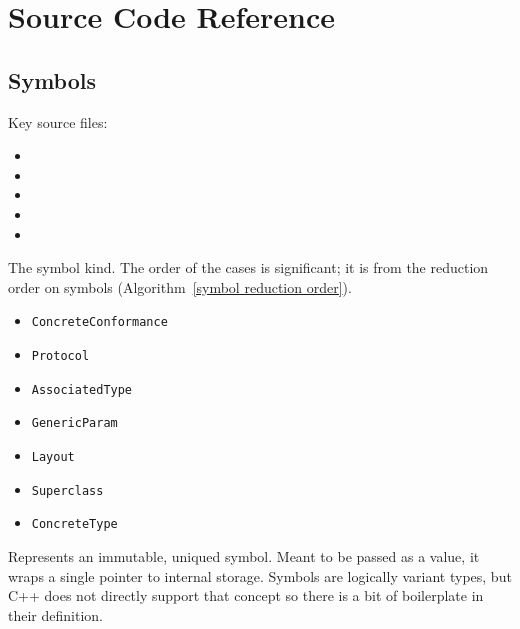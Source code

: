 \documentclass[../generics]{subfiles}
\begin{document}
\section{Source Code Reference}\label{symbols terms rules sourceref}

\subsection*{Symbols}

Key source files:
\begin{itemize}
\item {}
\item {}
\item {}
\item {}
\item {}
\end{itemize}


The symbol kind. The order of the cases is significant; it is from the reduction order on symbols (Algorithm~\ref{symbol reduction order}).
\begin{itemize}
\item \texttt{ConcreteConformance}
\item \texttt{Protocol}
\item \texttt{AssociatedType}
\item \texttt{GenericParam}
\item \texttt{Layout}
\item \texttt{Superclass}
\item \texttt{ConcreteType}
\end{itemize}

Represents an immutable, uniqued symbol. Meant to be passed as a value, it wraps a single pointer to internal storage. Symbols are logically variant types, but C++ does not directly support that concept so there is a bit of boilerplate in their definition.
\end{document}

